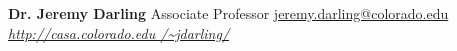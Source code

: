 \begin{minipage}{\textwidth}
    \position{}{}
    {\textbf{Dr. Jeremy Darling}}
    {{Associate Professor}}
    {\href{mailto:jeremy.darling@colorado.edu}{jeremy.darling@colorado.edu}}
    {\href{http://casa.colorado.edu/~jdarling/}{\textit{http://casa.colorado.edu
    /\textasciitilde jdarling/}}}
    \vspace{3ex}
\end{minipage}